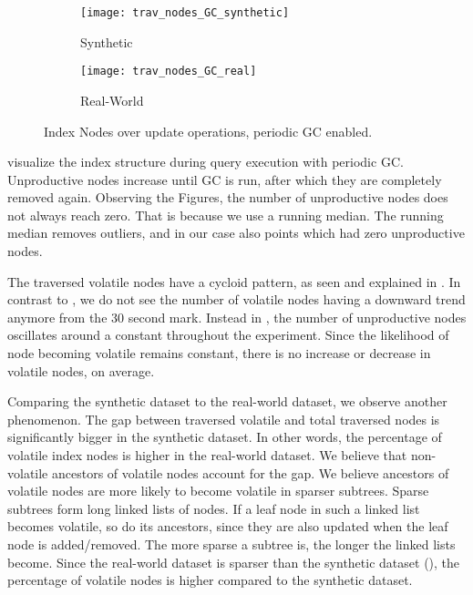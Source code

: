 \documentclass[abstracton,12pt]{scrartcl}
\theoremstyle{definition}
\begin{document}
\begin{figure}[ht]
  \centering
  \begin{subfigure}{0.49\linewidth}
    \centering
    \caption{Synthetic}
    \texttt{[image: trav\_nodes\_GC\_synthetic]}
    \label{fig:trav_nodes_GC_synthetic}
  \end{subfigure}
  \begin{subfigure}{0.49\linewidth}
    \centering
    \caption{Real-World}
    \texttt{[image: trav\_nodes\_GC\_real]}
    \label{fig:trav_nodes_GC_real}
  \end{subfigure}
  \vspace{-0.5cm}
  \caption{Index Nodes over update operations, periodic GC enabled.}
\end{figure}

 visualize the index
structure during query execution with periodic GC. Unproductive
nodes increase until GC is run, after which they are completely removed again.
Observing the Figures, the number of unproductive nodes does not always reach zero.
That is because we use a running median. The running median removes outliers, and in
our case also points which had zero unproductive nodes.

The traversed volatile nodes have a cycloid pattern, as seen and explained in
.
In contrast to , 
we do not see the number of volatile nodes
having a downward trend anymore from the 30 second mark.
Instead in , 
the number of unproductive nodes oscillates around a constant throughout the experiment. 
Since the likelihood of node becoming volatile remains constant, there is no
increase or decrease in volatile nodes, on average.

Comparing the synthetic dataset to the real-world dataset, we observe another phenomenon.
The gap between traversed volatile and total traversed nodes is significantly bigger
in the synthetic dataset. In other words, the percentage of volatile index nodes
is higher in the real-world dataset. We believe that non-volatile
ancestors of volatile nodes account for the gap. 
We believe ancestors of volatile nodes are more likely to become volatile in
sparser subtrees. Sparse subtrees form long linked lists of nodes. If a leaf node
in such a linked list becomes volatile, so do its ancestors, since they are also
updated when the leaf node is added/removed. The more sparse a subtree is, the longer
the linked lists become.
Since the real-world dataset is sparser than the synthetic dataset (),
the percentage of volatile nodes is higher compared to the synthetic dataset.
\end{document}
